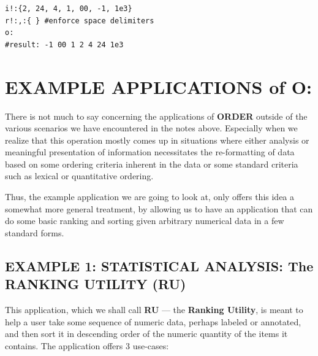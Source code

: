 \documentclass[a4paper, 18pt]{book} %
\begin{document}
{\vspace{2em}

  \begin{tcolorbox}[teaterminalstyle, title=O: EXAMPLE 10: Sorting Numbers BUT with VALID FORMATTING, breakable]
  \begin{lstlisting}[language=TEA,breaklines=true,]
i!:{2, 24, 4, 1, 00, -1, 1e3}
r!:,:{ } #enforce space delimiters
o:
#result: -1 00 1 2 4 24 1e3
   \end{lstlisting}
  \end{tcolorbox}


\vspace{1em}



\section{EXAMPLE APPLICATIONS of O:}
\label{SECEXAMPO}

  
There is not much to say concerning the applications of \textbf{ORDER} outside of the various scenarios we have encountered in the notes above. Especially when we realize that this operation mostly comes up in situations where either analysis or meaningful presentation of information necessitates the re-formatting of data based on some ordering criteria inherent in the data or some standard criteria such as lexical or quantitative ordering.

\vspace{2em}

Thus, the example application we are going to look at, only offers this idea a somewhat more general treatment, by allowing us to have an application that can do some basic ranking and sorting given arbitrary numerical data in a few standard forms.



\subsection{EXAMPLE 1: \textbf{STATISTICAL ANALYSIS:} The RANKING UTILITY (RU)}
\label{SECEXAMP1O}


This application, which we shall call \textbf{RU} --- the \textbf{Ranking Utility}, is meant to help a user take some sequence of numeric data, perhaps labeled or annotated, and then sort it in descending order of the numeric quantity of the items it contains. The application offers 3 use-cases:

\vspace{2em}

}
\end{document}
